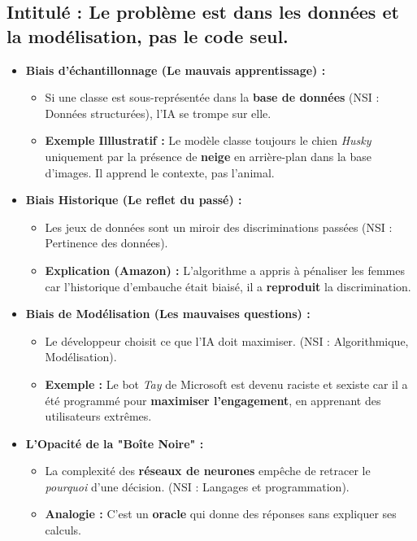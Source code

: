 \subsection*{Intitulé : Le problème est dans les données et la modélisation, pas le code seul.}
\begin{itemize}[label=$\diamond$]
    \item \textbf{Biais d'échantillonnage (Le mauvais apprentissage) :}
    \begin{itemize}[label=\textendash]
        \item Si une classe est sous-représentée dans la \textbf{base de données} (NSI : Données structurées), l'IA se trompe sur elle.
        \item \textbf{Exemple Illlustratif :} Le modèle classe toujours le chien \emph{Husky} uniquement par la présence de \textbf{neige} en arrière-plan dans la base d'images. Il apprend le contexte, pas l'animal.
    \end{itemize}
    \item \textbf{Biais Historique (Le reflet du passé) :}
    \begin{itemize}[label=\textendash]
        \item Les jeux de données sont un miroir des discriminations passées (NSI : Pertinence des données).
        \item \textbf{Explication (Amazon) :} L'algorithme a appris à pénaliser les femmes car l'historique d'embauche était biaisé, il a \textbf{reproduit} la discrimination.
    \end{itemize}
    \item \textbf{Biais de Modélisation (Les mauvaises questions) :}
    \begin{itemize}[label=\textendash]
        \item Le développeur choisit ce que l'IA doit maximiser. (NSI : Algorithmique, Modélisation).
        \item \textbf{Exemple : } Le bot \emph{Tay} de Microsoft est devenu raciste et sexiste car il a été programmé pour \textbf{maximiser l'engagement}, en apprenant des utilisateurs extrêmes.
    \end{itemize}
    \item \textbf{L'Opacité de la "Boîte Noire" :}
    \begin{itemize}[label=\textendash]
        \item La complexité des \textbf{réseaux de neurones} empêche de retracer le \emph{pourquoi} d'une décision. (NSI : Langages et programmation).
        \item \textbf{Analogie : } C'est un \textbf{oracle} qui donne des réponses sans expliquer ses calculs.
    \end{itemize}
\end{itemize}

